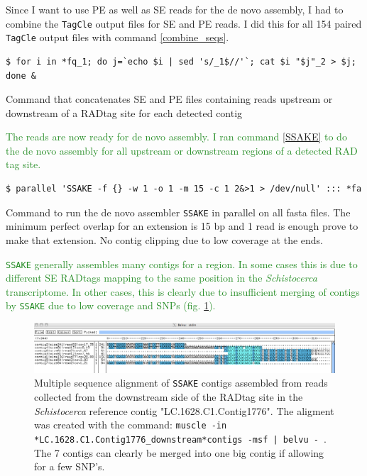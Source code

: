 \documentclass{article}\usepackage[]{graphicx}\usepackage[]{color}
\newcommand{\roger}[1]{ \textcolor[named]{ForestGreen}{#1} }
\begin{document}
Since I want to use PE as well as SE reads for the de novo assembly, I had to combine the \texttt{TagCle} output files for SE and PE reads. I did this for all 154 paired \texttt{TagCle} output files with command \ref{combine_seqs}.

\begin{command}[htb]
\captionsetup{type=command} %
\begin{Verbatim}[fontsize=\footnotesize]
$ for i in *fq_1; do j=`echo $i | sed 's/_1$//'`; cat $i "$j"_2 > $j; done &
\end{Verbatim}
\caption{Command that concatenates SE and PE files containing reads upstream or downstream of a RADtag site for each detected contig}
\label{combine_seqs}
\end{command}

\roger{The reads are now ready for de novo assembly. I ran command \ref{SSAKE} to do the de novo assembly for all upstream or downstream regions of a detected RAD tag site.}

\begin{command}[htb]
\captionsetup{type=command} %
\begin{Verbatim}[fontsize=\footnotesize]
$ parallel 'SSAKE -f {} -w 1 -o 1 -m 15 -c 1 2&>1 > /dev/null' ::: *fa
\end{Verbatim}
\caption{Command to run the de novo assembler \texttt{SSAKE} in parallel on all fasta files. The minimum perfect overlap for an extension is 15 bp and 1 read is enough prove to make that extension. No contig clipping due to low coverage at the ends.}
\label{SSAKE}
\end{command}

\roger{\texttt{SSAKE} generally assembles many contigs for a region. In some cases this is due to different SE RADtags mapping to the same position in the \textit{Schistocerca} transcriptome. In other cases, this is clearly due to insufficient merging of contigs by \texttt{SSAKE} due to low coverage and SNPs (fig. \ref{contig_alignment}).} 

\begin{figure}[htb]
\centering
\includegraphics[width=\textwidth]{./figure/contig_alignment}
\caption{Multiple sequence alignment of \texttt{SSAKE} contigs assembled from reads collected from the downstream side of the RADtag site in the \textit{Schistocerca} reference contig "LC.1628.C1.Contig1776". The aligment was created with the command: \texttt{muscle -in *LC.1628.C1.Contig1776\_downstream*contigs -msf | belvu -}~. The 7 contigs can clearly be merged into one big contig if allowing for a few SNP's.}
\label{contig_alignment}
\end{figure}
\end{document}
